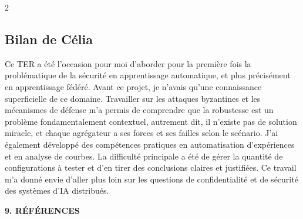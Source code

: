 \documentclass{article}
\begin{document}
\begin{multicols}{2}
\subsection*{Bilan de C\'elia}

Ce TER a \'et\'e l'occasion pour moi d'aborder pour la premi\`ere fois la probl\'ematique
de la s\'ecurit\'e en apprentissage automatique, et plus pr\'ecis\'ement en apprentissage
f\'ed\'er\'e. Avant ce projet, je n'avais qu'une connaissance superficielle de ce domaine.
Travailler sur les attaques byzantines et les m\'ecanismes de d\'efense m'a permis
de comprendre que la robustesse est un probl\`eme fondamentalement contextuel, autrement dit, il n'existe pas de solution miracle, et chaque agr\'egateur a ses forces et ses failles
selon le sc\'enario. J'ai \'egalement d\'evelopp\'e des comp\'etences pratiques en
automatisation d'exp\'eriences et en analyse de courbes. La difficult\'e principale
a \'et\'e de g\'erer la quantit\'e de configurations \`a tester et d'en tirer des
conclusions claires et justifi\'ees. Ce travail m'a donn\'e envie d'aller plus loin
sur les questions de confidentialit\'e et de s\'ecurit\'e des syst\`emes d'IA distribu\'es.

\end{multicols}

\newpage

\begin{center}
{\normalsize\bfseries 9. \MakeUppercase{R\'ef\'erences}}
\end{center}

\renewcommand{\refname}{\vspace{-5ex}}
\end{document}
